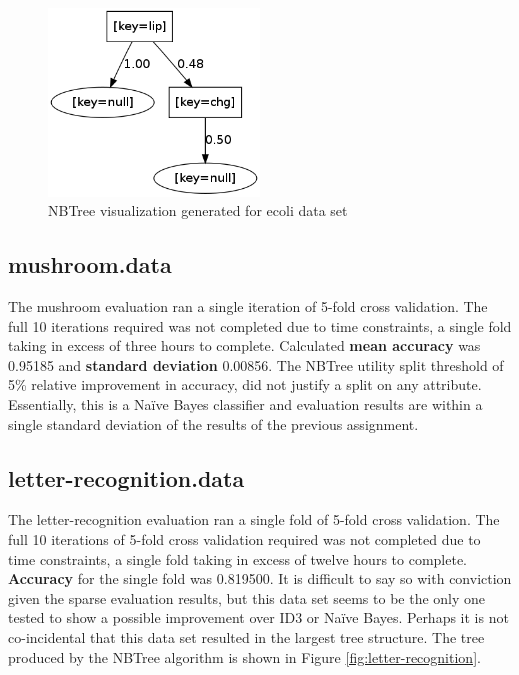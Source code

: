 \documentclass[10pt]{report}
\begin{document}
\begin{figure}
  \begin{center}
	\includegraphics[width=0.5\textwidth,height=!]{ecoli}
  \end{center}
  \caption{NBTree visualization generated for ecoli data set}
  \label{fig:ecoli}
\end{figure} 


\subsection*{mushroom.data}
The mushroom evaluation ran a single iteration of 5-fold cross
validation. The full 10 iterations required was not completed due to
time constraints, a single fold taking in excess of three hours to
complete. Calculated \textbf{mean accuracy} was 0.95185 and 
\textbf{standard deviation} 0.00856. The NBTree utility split
threshold of 5\% relative improvement in accuracy, did not justify a
split on any attribute. Essentially, this is a Na\"{i}ve Bayes
classifier and evaluation results are within a single standard
deviation of the results of the previous assignment.


\subsection*{letter-recognition.data}
The letter-recognition evaluation ran a single fold of 5-fold cross
validation. The full 10 iterations of 5-fold cross validation required
was not completed due to time constraints, a single fold taking in
excess of twelve hours to complete. \textbf{Accuracy} for the single
fold was 0.819500. It is difficult to say so with conviction given
the sparse evaluation results, but this data set seems to be the only one
tested to show a possible improvement over ID3 or Na\"{i}ve
Bayes. Perhaps it is not co-incidental that this data set resulted in
the largest tree structure. The tree produced by the NBTree algorithm
is shown in Figure \ref{fig:letter-recognition}. 
\end{document}
